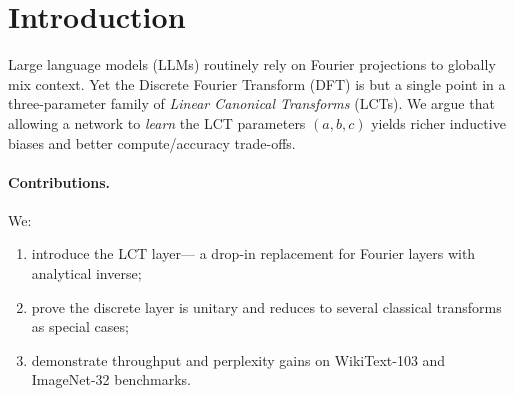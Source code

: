 \section{Introduction}
Large language models (LLMs) routinely rely on Fourier projections to globally mix context.  Yet the Discrete Fourier Transform (DFT) is but a single point in a three-parameter family of \emph{Linear Canonical Transforms} (LCTs).  We argue that allowing a network to \emph{learn} the LCT parameters \((a,b,c)\) yields richer inductive biases and better compute/accuracy trade-offs.

\paragraph{Contributions.}  We:
\begin{enumerate}
  \item introduce the \textsc{LCT} layer— a drop-in replacement for Fourier layers with analytical inverse;
  \item prove the discrete layer is unitary and reduces to several classical transforms as special cases;
  \item demonstrate throughput and perplexity gains on WikiText-103 and ImageNet-32 benchmarks.
\end{enumerate}